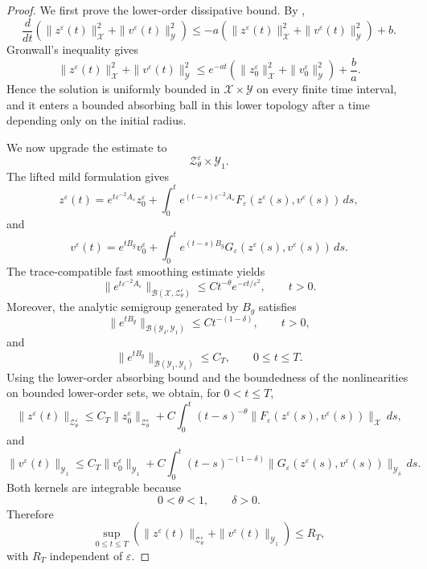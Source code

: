 \documentclass[11pt]{article}
\theoremstyle{definition}
\theoremstyle{remark}
\numberwithin{equation}{section}
\begin{document}
\begin{proof}
We first prove the lower-order dissipative bound. By
,
\[
\frac{d}{dt}
\left(
\|z^\varepsilon(t)\|_{\mathcal X}^2
+
\|v^\varepsilon(t)\|_{\mathcal Y}^2
\right)
\le
-a
\left(
\|z^\varepsilon(t)\|_{\mathcal X}^2
+
\|v^\varepsilon(t)\|_{\mathcal Y}^2
\right)
+b.
\]
Gronwall's inequality gives
\[
\|z^\varepsilon(t)\|_{\mathcal X}^2
+
\|v^\varepsilon(t)\|_{\mathcal Y}^2
\le
e^{-at}
\left(
\|z_0^\varepsilon\|_{\mathcal X}^2
+
\|v_0^\varepsilon\|_{\mathcal Y}^2
\right)
+
\frac ba.
\]
Hence the solution is uniformly bounded in
\(\mathcal X\times\mathcal Y\) on every finite time interval, and it enters a
bounded absorbing ball in this lower topology after a time depending only on
the initial radius.

We now upgrade the estimate to
\[
\mathcal Z_\theta^\varepsilon\times\mathcal Y_1.
\]
The lifted mild formulation gives
\[
z^\varepsilon(t)
=
e^{t\varepsilon^{-2}A_\varepsilon}z_0^\varepsilon
+
\int_0^t
e^{(t-s)\varepsilon^{-2}A_\varepsilon}
F_\varepsilon(z^\varepsilon(s),v^\varepsilon(s))\,ds,
\]
and
\[
v^\varepsilon(t)
=
e^{tB_g}v_0^\varepsilon
+
\int_0^t
e^{(t-s)B_g}
G_\varepsilon(z^\varepsilon(s),v^\varepsilon(s))\,ds.
\]
The trace-compatible fast smoothing estimate yields
\[
\|e^{t\varepsilon^{-2}A_\varepsilon}\|_{\mathcal B(\mathcal X,\mathcal Z_\theta^\varepsilon)}
\le
Ct^{-\theta}e^{-ct/\varepsilon^2},
\qquad t>0.
\]
Moreover, the analytic semigroup generated by \(B_g\) satisfies
\[
\|e^{tB_g}\|_{\mathcal B(\mathcal Y_\delta,\mathcal Y_1)}
\le
Ct^{-(1-\delta)},
\qquad t>0,
\]
and
\[
\|e^{tB_g}\|_{\mathcal B(\mathcal Y_1,\mathcal Y_1)}
\le C_T,
\qquad 0\le t\le T.
\]
Using the lower-order absorbing bound and the boundedness of the nonlinearities
on bounded lower-order sets, we obtain, for \(0<t\le T\),
\[
\|z^\varepsilon(t)\|_{\mathcal Z_\theta^\varepsilon}
\le
C_T\|z_0^\varepsilon\|_{\mathcal Z_\theta^\varepsilon}
+
C
\int_0^t
(t-s)^{-\theta}
\|F_\varepsilon(z^\varepsilon(s),v^\varepsilon(s))\|_{\mathcal X}
\,ds,
\]
and
\[
\|v^\varepsilon(t)\|_{\mathcal Y_1}
\le
C_T\|v_0^\varepsilon\|_{\mathcal Y_1}
+
C
\int_0^t
(t-s)^{-(1-\delta)}
\|G_\varepsilon(z^\varepsilon(s),v^\varepsilon(s))\|_{\mathcal Y_\delta}
\,ds.
\]
Both kernels are integrable because
\[
0<\theta<1,
\qquad
\delta>0.
\]
Therefore
\[
\sup_{0\le t\le T}
\left(
\|z^\varepsilon(t)\|_{\mathcal Z_\theta^\varepsilon}
+
\|v^\varepsilon(t)\|_{\mathcal Y_1}
\right)
\le
R_T,
\]
with \(R_T\) independent of \(\varepsilon\).


\end{proof}
\end{document}
